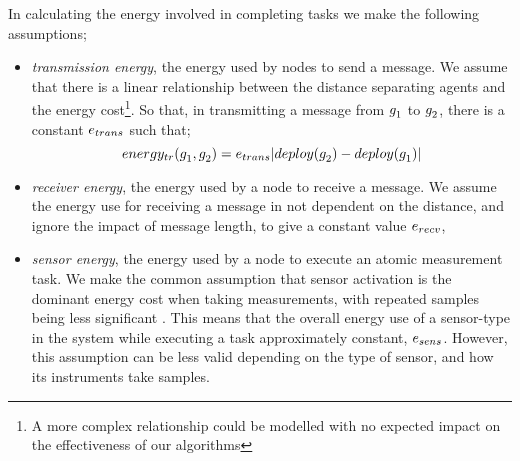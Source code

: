 \newcommand{\formalTransmissionEnergy}[2]{
	\functionFormal{energy_{tr}}
	{\setAgent{}{} \times \setAgent{}{}}
	{\setRealNumbersPositive{}{}}
}
\newcommand{\functionTransmissionEnergy}[2]{
	\functionSignature{energy_{tr}}
	{\varAgent{#1}{},\varAgent{#2}{}}
}
\newcommand{\functionTransmissionEnergyIndexed}[2]{
	\functionTransmissionEnergy{\varAgent{i}{}}{\varAgent{i+1}{}}
}
In calculating the energy involved in completing tasks we make the following assumptions;
\begin{itemize}
	\item \textit{transmission energy}, the energy used by nodes to send a message. We assume that there is a linear relationship between the distance separating agents and the energy cost\footnote{A more complex relationship could be modelled with no expected impact on the effectiveness of our algorithms}. So that, in transmitting a message from $g_{1}^{}$ to $g_{2}^{}$, there is a constant $e_{trans}$ such that;
	\begin{equation}
		\functionTransmissionEnergy{1}{2}
		=  \varTransmissionEnergy{}{}\funcSize{\functionDeployment{\varAgent{2}{}}{} - \functionDeployment{\varAgent{1}{}}{}}
	\end{equation}
	\item \textit{receiver energy}, the energy used by a node to receive a message. We assume the energy use for receiving a message in not dependent on the distance, and ignore the impact of message length, to give a constant value $e_{recv}$, 
	\item \textit{sensor energy}, the energy used by a node to execute an atomic measurement task. We make the common assumption that sensor activation is the dominant energy cost when taking measurements, with repeated samples being less significant \citep{Razzaque2014}. This means that the overall energy use of a sensor-type in the system while executing a task approximately constant, $e_{sens}$. However, this assumption can be less valid depending on the type of sensor, and how its instruments take samples.
\end{itemize}
